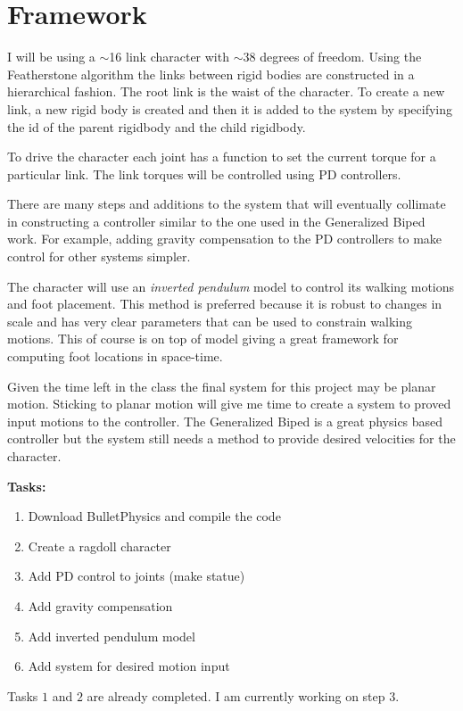 
\section{Framework}
\label{sec:framework}

I will be using a $\sim$16 link character with $\sim$38 degrees of freedom. 
Using the Featherstone algorithm the links between rigid bodies are constructed in a hierarchical fashion. 
The root link is the waist of the character. 
To create a new link, a new rigid body is created and then it is added to the system by specifying the id of the parent rigidbody and the child rigidbody.

To drive the character each joint has a function to set the current torque for a particular link.
The link torques will be controlled using PD controllers.

There are many steps and additions to the system that will eventually collimate in constructing a controller similar to the one used in the Generalized Biped work. 
For example, adding gravity compensation to the PD controllers to make control for other systems simpler.

The character will use an \emph{inverted pendulum} model to control its walking motions and foot placement. 
This method is preferred because it is robust to changes in scale and has very clear parameters that can be used to constrain walking motions. This of course is on top of model giving a great framework for computing foot locations in space-time.


Given the time left in the class the final system for this project may be planar motion.
Sticking to planar motion will give me time to create a system to proved input motions to the controller. 
The Generalized Biped is a great physics based controller but the system still needs a method to provide desired velocities for the character. 

\noindent\textbf{Tasks:}

\begin{enumerate}
	\item Download BulletPhysics and compile the code
	\item Create a ragdoll character
	\item Add PD control to joints (make statue) 
	\item Add gravity compensation
	\item Add inverted pendulum model
	\item Add system for desired motion input
\end{enumerate}

Tasks $1$ and $2$ are already completed. I am currently working on step $3$.